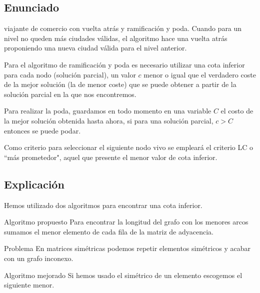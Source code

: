 \subsection{Enunciado}
\begin{frame}
	\begin{block}{viajante de comercio con vuelta atrás y ramificación y poda.}
	Cuando para un nivel no queden más ciudades válidas, el algoritmo hace una vuelta atrás 
	proponiendo una nueva ciudad válida para el nivel anterior.

	Para el algoritmo de ramificación y poda es necesario utilizar una cota inferior para cada nodo 
	(solución parcial), un valor $c$ menor o igual que el verdadero coste de la mejor solución (la de 
	menor coste) que se puede obtener a partir de la solución parcial en la que nos encontremos.

	Para realizar la poda, guardamos en todo momento en una variable $C$ el costo de la mejor solución
	obtenida hasta ahora, si para una solución parcial, $c>C$ entonces se puede podar.

	Como criterio para seleccionar el siguiente nodo vivo se empleará el criterio LC o 
	``más prometedor", aquel que presente el menor valor de cota inferior.
	\end{block}
\end{frame}


\subsection{Explicación}
	
\begin{frame}
Hemos utilizado dos algoritmos para encontrar una cota inferior.
	
	\begin{block}{Algoritmo propuesto}
	Para encontrar la longitud del grafo con los menores arcos sumamos el menor elemento de cada fila de la matriz de adyacencia.
	\end{block}
	
	\begin{alertblock}{Problema}
	En matrices simétricas podemos repetir elementos simétricos y acabar con un grafo inconexo.
	\end{alertblock}
	
	\begin{block}{Algoritmo mejorado}
	Si hemos usado el simétrico de un elemento escogemos el siguiente menor.
	\end{block}
\end{frame}

